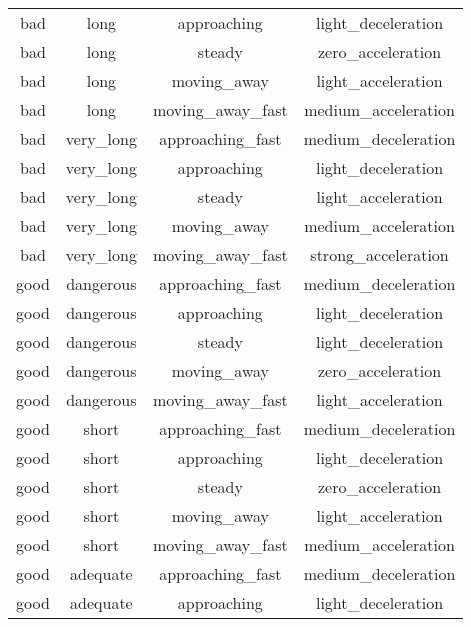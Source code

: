 \begin{table}[htbp]
\begin{tabular}{|c|c|c|c|}
            bad       & long        & approaching          & light\_deceleration \\
            bad       & long        & steady               & zero\_acceleration \\
            bad       & long        & moving\_away         & light\_acceleration \\
            bad       & long        & moving\_away\_fast   & medium\_acceleration \\
            bad       & very\_long  & approaching\_fast     & medium\_deceleration \\
            bad       & very\_long  & approaching          & light\_deceleration \\
            bad       & very\_long  & steady               & light\_acceleration \\
            bad       & very\_long  & moving\_away         & medium\_acceleration \\
            bad       & very\_long  & moving\_away\_fast   & strong\_acceleration \\
            good      & dangerous   & approaching\_fast     & medium\_deceleration \\
            good      & dangerous   & approaching          & light\_deceleration \\
            good      & dangerous   & steady               & light\_deceleration \\
            good      & dangerous   & moving\_away         & zero\_acceleration \\
            good      & dangerous   & moving\_away\_fast   & light\_acceleration \\
            good      & short       & approaching\_fast     & medium\_deceleration \\
            good      & short       & approaching          & light\_deceleration \\
            good      & short       & steady               & zero\_acceleration \\
            good      & short       & moving\_away         & light\_acceleration \\
            good      & short       & moving\_away\_fast   & medium\_acceleration \\
            good      & adequate    & approaching\_fast     & medium\_deceleration \\
            good      & adequate    & approaching          & light\_deceleration \\

\end{tabular}
\end{table}
